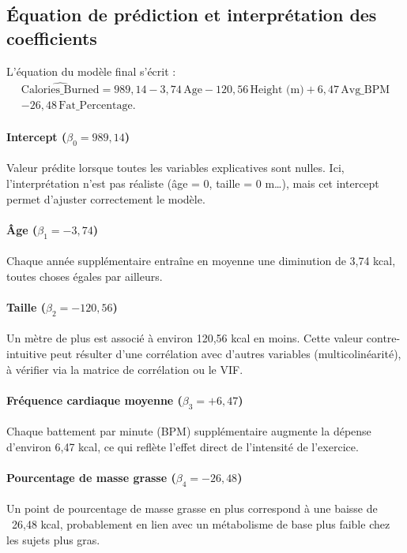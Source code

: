 \documentclass[12pt,a4paper]{article}
\begin{document}
\subsection{Équation de prédiction et interprétation des coefficients}

L’équation du modèle final s’écrit :
\begin{multline*}
\widehat{\text{Calories\_Burned}}
=989{,}14-3{,}74\,\text{Age}
-120{,}56\,\text{Height (m)}
+6{,}47\,\text{Avg\_BPM}\\
-26{,}48\,\text{Fat\_Percentage}.
\end{multline*}

\paragraph{Intercept (\(\beta_0 = 989{,}14\))}  
Valeur prédite lorsque toutes les variables explicatives sont nulles. Ici, l’interprétation n’est pas réaliste (âge = 0, taille = 0 m…), mais cet intercept permet d’ajuster correctement le modèle.

\paragraph{Âge (\(\beta_1 = -3{,}74\))}  
Chaque année supplémentaire entraîne en moyenne une diminution de 3,74 kcal, toutes choses égales par ailleurs.

\paragraph{Taille (\(\beta_2 = -120{,}56\))}  
Un mètre de plus est associé à environ 120,56 kcal en moins. Cette valeur contre-intuitive peut résulter d’une corrélation avec d’autres variables (multicolinéarité), à vérifier via la matrice de corrélation ou le VIF.

\paragraph{Fréquence cardiaque moyenne (\(\beta_3 = +6{,}47\))}  
Chaque battement par minute (BPM) supplémentaire augmente la dépense d’environ 6,47 kcal, ce qui reflète l’effet direct de l’intensité de l’exercice.

\paragraph{Pourcentage de masse grasse (\(\beta_4 = -26{,}48\))}  
Un point de pourcentage de masse grasse en plus correspond à une baisse de ~26,48 kcal, probablement en lien avec un métabolisme de base plus faible chez les sujets plus gras.
\end{document}
